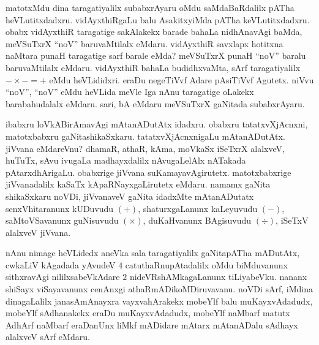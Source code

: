 matotxMdu dina taragatiyalilx subabxrAyaru oMdu saMdaBaRdalilx pATha heVLutitxdadxru. vidAyxthiRgaLu balu AsakitxyiMda pATha keVLutitxdadxru. obabx vidAyxthiR taragatige sakAlakekx barade bahaLa nidhAnavAgi baMda, meVSuTxrX ``noV'' baruvaMtilalx eMdaru. vidAyxthiR savxlapx hotitxna naMtara punaH taragatige sarf barale eMda? meVSuTxrX punaH ``noV'' baralu baruvaMtilalx eMdaru. vidAyxthiR bahaLa budidhxvaMta, sArf taragatiyalilx $-\times-=+$ eMdu heVLididxri. eraDu negeTiVvf Adare pAsiTiVvf Agutetx. niVvu ``noV'', ``noV'' eMdu heVLida meVle Iga nAnu taragatige oLakekx barabahudalalx eMdaru. sari, bA eMdaru meVSuTxrX gaNitada subabxrAyaru.

\medskip

ibabxru loVkABirAmavAgi mAtanADutAtx idadxru. obabxru tatatxvXjAcnxni, matotxbabxru gaNitashikaSxkaru. tatatxvXjAcnxnigaLu mAtanADutAtx. jiVvana eMdareVnu? dhamaR, athaR, kAma, moVkaSx iSeTxrX alalxveV, huTuTx, sAvu ivugaLa madhayxdalilx nAvugaLelAlx nATakada pAtarxdhArigaLu. obabxrige jiVvana suKamayavAgirutetx. matotxbabxrige jiVvanadalilx kaSaTx kApaRNayxgaLirutetx eMdaru. namamx gaNita shikaSxkaru noVDi, jiVvanaveV gaNita idadxMte mAtanADutatx senxVhitaranunx kUDuvudu $(+)$, shaturxgaLanunx kaLeyuvudu $(-)$, saMtoVSavanunx guNisuvudu $(\times)$, duKaHvanunx BAgisuvudu $(\div)$, iSeTxV alalxveV jiVvana.

\medskip

nAnu nimage heVLidedx aneVka sala taragatiyalilx gaNitapATha mADutAtx, cwkaLiV kAgadada yAvudeV $4$ catuthaRnupAtadalilx oMdu biMduvanunx sithxravAgi nililxsabeVkAdare $2$ nideVRshAMkagaLanunx tiLiyabeVku. nananx shiSayx viSayavanunx cenAnxgi athaRmADikoMDiruvavanu. noVDi sArf, iMdina dinagaLalilx janasAmAnayxra vayxvahArakekx mobeYlf balu muKayxvAdadudx, mobeYlf sAdhanakekx eraDu muKayxvAdadudx, mobeYlf naMbarf matutx AdhArf naMbarf eraDanUnx liMkf mADidare mAtarx mAtanADalu sAdhayx alalxveV sArf eMdaru.

